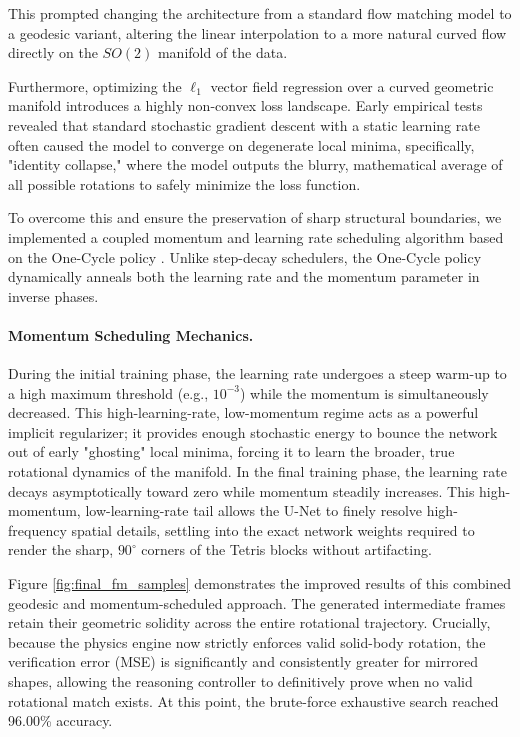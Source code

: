 \documentclass{l4proj}
\begin{document}
This prompted changing the architecture from a standard flow matching model to a geodesic variant, altering the linear interpolation to a more natural curved flow directly on the $SO(2)$ manifold of the data.

Furthermore, optimizing the $\ell_1$ vector field regression over a curved geometric manifold introduces a highly non-convex loss landscape. Early empirical tests revealed that standard stochastic gradient descent with a static learning rate often caused the model to converge on degenerate local minima, specifically, "identity collapse," where the model outputs the blurry, mathematical average of all possible rotations to safely minimize the loss function.

To overcome this and ensure the preservation of sharp structural boundaries, we implemented a coupled momentum and learning rate scheduling algorithm based on the One-Cycle policy \citep{smith2019super}. Unlike step-decay schedulers, the One-Cycle policy dynamically anneals both the learning rate and the momentum parameter in inverse phases.

\paragraph{Momentum Scheduling Mechanics.} During the initial training phase, the learning rate undergoes a steep warm-up to a high maximum threshold (e.g., $10^{-3}$) while the momentum is simultaneously decreased. This high-learning-rate, low-momentum regime acts as a powerful implicit regularizer; it provides enough stochastic energy to bounce the network out of early "ghosting" local minima, forcing it to learn the broader, true rotational dynamics of the manifold. In the final training phase, the learning rate decays asymptotically toward zero while momentum steadily increases. This high-momentum, low-learning-rate tail allows the U-Net to finely resolve high-frequency spatial details, settling into the exact network weights required to render the sharp, $90^{\circ}$ corners of the Tetris blocks without artifacting.

Figure \ref{fig:final_fm_samples} demonstrates the improved results of this combined geodesic and momentum-scheduled approach. The generated intermediate frames retain their geometric solidity across the entire rotational trajectory. Crucially, because the physics engine now strictly enforces valid solid-body rotation, the verification error (MSE) is significantly and consistently greater for mirrored shapes, allowing the reasoning controller to definitively prove when no valid rotational match exists. At this point, the brute-force exhaustive search reached 96.00\% accuracy.
\end{document}
